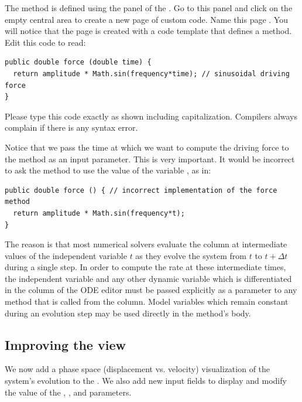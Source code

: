 The  method is defined using the  panel of the . Go to this panel and click on the empty central area to create a new page of custom code. Name this page . You will notice that the page is created with a code template that defines a method. Edit this code to read:

\begin{listing}
\begin{verbatim}
public double force (double time) {
  return amplitude * Math.sin(frequency*time); // sinusoidal driving force
}
\end{verbatim}
\end{listing}
\noindent Please type this code exactly as shown including capitalization. Compilers always complain if there is any syntax error.

Notice that we pass the time at which we want to compute the driving force to the method as an input parameter. This is very important. It would be incorrect to ask the method to use the value of the variable , as in:

\begin{listing}
\begin{verbatim}
public double force () { // incorrect implementation of the force method
  return amplitude * Math.sin(frequency*t);
}
\end{verbatim}
\end{listing}
\noindent The reason is that most numerical solvers evaluate the  column at intermediate values of the independent variable $t$ as they evolve the system from $t$ to $t+\Delta t$ during a single step. In order to compute the rate at these intermediate times, the independent variable and any other dynamic variable which is differentiated in the  column of the ODE editor must be passed explicitly as a parameter to any method that is called from the  column. Model variables which remain constant during an evolution step may be used directly in the method's body.

\subsection{Improving the view}\label{section:02ModifyingView}

We now add a phase space (displacement vs. velocity) visualization of the system's evolution to the . We also add new input fields to display and modify the value of the , , and  parameters.

